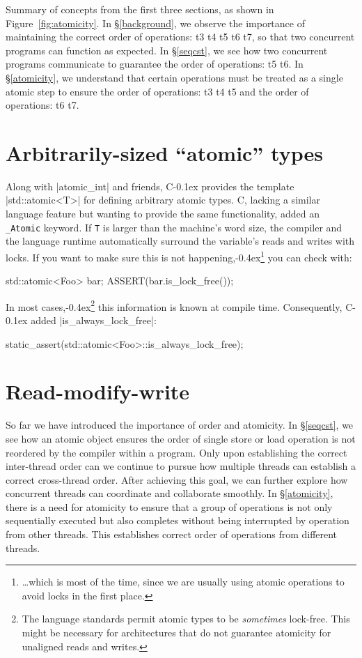 \documentclass[fontsize=10pt, oneside]{scrartcl}
\newcommand{\punckern}{\kern-0.4ex}
\newcommand{\monobox}[1]{\mbox{\texttt{#1}}}
\newcommand{\keyword}[1]{\monobox{\color{darkGreen}#1}}
\newcommand{\cplusplus}[1]{C\kern-0.1ex\raisebox{0.15ex}{\texttt{++}}}
\newcommand{\clang}[1]{C}
\newcommand{\fig}[1]{Figure~\ref{#1}}
\newcommand{\secref}[1]{\hyperref[#1]{\textsc{\S}\ref*{#1}}}
\begin{document}
Summary of concepts from the first three sections, as shown in \fig{fig:atomicity}.
In \secref{background}, we observe the importance of maintaining the correct order of operations: t3 \to t4 \to t5 \to t6 \to t7, so that two concurrent programs can function as expected.
In \secref{seqcst}, we see how two concurrent programs communicate to guarantee the order of operations: t5 \to t6.
In \secref{atomicity}, we understand that certain operations must be treated as a single atomic step to ensure the order of operations: t3 \to t4 \to t5 and the order of operations: t6 \to t7.

\section{Arbitrarily-sized ``atomic'' types}
\label{atomictype}
Along with \cc|atomic_int| and friends,
\cplusplus{} provides the template \cpp|std::atomic<T>| for defining arbitrary atomic types.
\clang{}, lacking a similar language feature but wanting to provide the same functionality,
added an \keyword{\_Atomic} keyword.
If \texttt{T} is larger than the machine's word size,
the compiler and the language runtime automatically surround the variable's reads and writes with locks.
If you want to make sure this is not happening,\punckern\footnote{%
\ldots which is most of the time,
since we are usually using atomic operations to avoid locks in the first place.}
you can check with:
\begin{cppcode}
std::atomic<Foo> bar;
ASSERT(bar.is_lock_free());
\end{cppcode}
In most cases,\punckern\footnote{%
The language standards permit atomic types to be \emph{sometimes} lock-free.
This might be necessary for architectures that do not guarantee atomicity for unaligned reads and writes.}
this information is known at compile time.
Consequently, \cplusplus{17} added \cpp|is_always_lock_free|:
\begin{cppcode}
static_assert(std::atomic<Foo>::is_always_lock_free);
\end{cppcode}

\section{Read-modify-write}
\label{rmw}

So far we have introduced the importance of order and atomicity.
In \secref{seqcst}, we see how an atomic object ensures the order of single store or load operation is not reordered by the compiler within a program. 
Only upon establishing the correct inter-thread order can we continue to pursue how multiple threads can establish a correct cross-thread order. 
After achieving this goal, we can further explore how concurrent threads can coordinate and collaborate smoothly.
In \secref{atomicity}, there is a need for atomicity to ensure that a group of operations is not only sequentially executed but also completes without being interrupted by operation from other threads.
This establishes correct order of operations from different threads.
\end{document}
